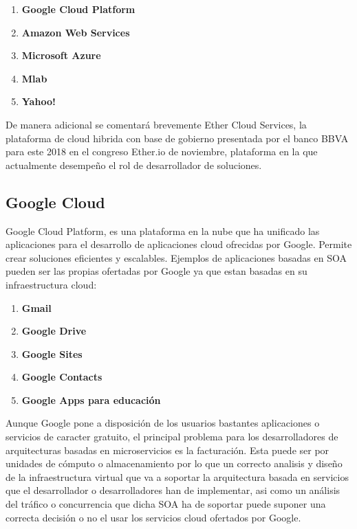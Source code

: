 \documentclass[a4paper,11pt]{book}
\begin{document}
\begin{enumerate}
\item \textbf{Google Cloud Platform}
\item \textbf{Amazon Web Services}
\item \textbf{Microsoft Azure}
\item \textbf{Mlab}
\item \textbf{Yahoo!}
\end{enumerate}

De manera adicional se comentará brevemente Ether Cloud Services, la plataforma de cloud hibrida con base de gobierno presentada por el banco BBVA para este 2018 en el congreso Ether.io de noviembre, plataforma en la que actualmente desempeño el rol de desarrollador de soluciones. 



\subsection{Google Cloud}

Google Cloud Platform, es una plataforma en la nube que ha unificado las aplicaciones para el desarrollo de aplicaciones cloud ofrecidas por Google. Permite crear soluciones  eficientes y escalables. Ejemplos de aplicaciones basadas en SOA pueden ser las propias ofertadas por Google ya que estan basadas en su infraestructura cloud: 

\begin{enumerate}
\item \textbf{Gmail}
\item \textbf{Google Drive}
\item \textbf{Google Sites}
\item \textbf{Google Contacts}
\item \textbf{Google Apps para educación}
\end{enumerate}

Aunque Google pone a disposición de los usuarios bastantes aplicaciones o servicios de caracter gratuito, el principal problema para los desarrolladores de arquitecturas basadas en microservicios es la facturación. Esta puede ser por unidades de cómputo o almacenamiento por lo que un correcto analisis y diseño de la infraestructura virtual que va a soportar la arquitectura basada en servicios que el desarrollador o desarrolladores han de implementar, asi como un análisis del tráfico o concurrencia que dicha SOA ha de soportar puede suponer una correcta decisión o no el usar los servicios cloud ofertados por Google. 
\end{document}
